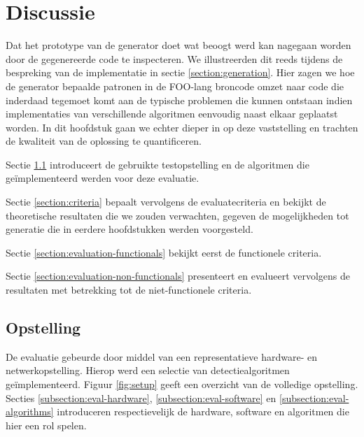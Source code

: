 
\chapter{Discussie}
\label{chapter:discussie}

Dat het prototype van de generator doet wat beoogt werd kan nagegaan worden
door de gegenereerde code te inspecteren. We illustreerden dit reeds tijdens de
bespreking van de implementatie in sectie \ref{section:generation}. Hier zagen
we hoe de generator bepaalde patronen in de FOO-lang broncode omzet naar code
die inderdaad tegemoet komt aan de typische problemen die kunnen ontstaan
indien implementaties van verschillende algoritmen eenvoudig naast elkaar
geplaatst worden. In dit hoofdstuk gaan we echter dieper in op deze
vaststelling en trachten de kwaliteit van de oplossing te quantificeren.

Sectie \ref{section:setup} introduceert de gebruikte testopstelling en de
algoritmen die ge\"implementeerd werden voor deze evaluatie.

Sectie \ref{section:criteria} bepaalt vervolgens de evaluatecriteria en bekijkt
de theoretische resultaten die we zouden verwachten, gegeven de mogelijkheden
tot generatie die in eerdere hoofdstukken werden voorgesteld.

Sectie \ref{section:evaluation-functionals} bekijkt eerst de functionele
criteria.

Sectie \ref{section:evaluation-non-functionals} presenteert en evalueert
vervolgens de resultaten met betrekking tot de niet-functionele criteria.

\vspace{-3mm}

\section{Opstelling}
\label{section:setup}

De evaluatie gebeurde door middel van een representatieve hardware- en
netwerkopstelling. Hierop werd een selectie van detectiealgoritmen
ge\"implementeerd. Figuur \ref{fig:setup} geeft een overzicht van de volledige
opstelling. Secties \ref{subsection:eval-hardware},
\ref{subsection:eval-software} en \ref{subsection:eval-algorithms} introduceren
respectievelijk de hardware, software en algoritmen die hier een rol spelen.

